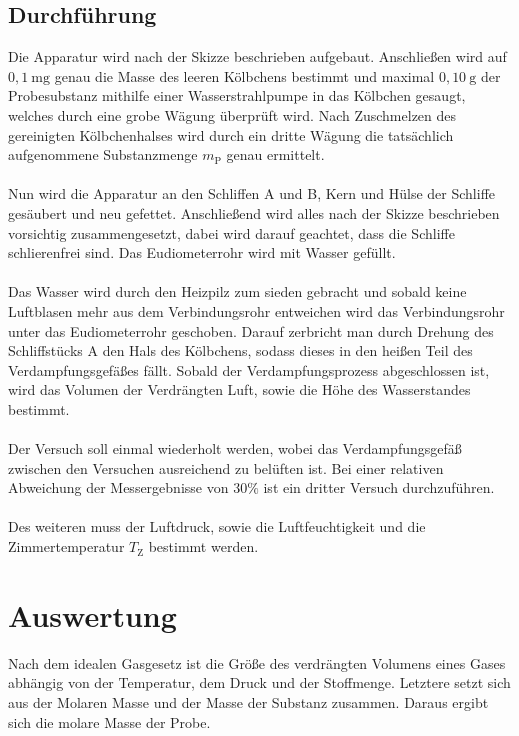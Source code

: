 \documentclass[12pt,a4paper,titlepage,headinclude,bibtotoc]{scrartcl}
\begin{document}
\subsection{Durchführung}
Die Apparatur wird nach der Skizze beschrieben aufgebaut. Anschließen wird auf $0,1 {~} \mathrm{mg}$ genau die Masse des leeren Kölbchens bestimmt und maximal $0,10{~}\mathrm{g}$ der Probesubstanz mithilfe einer Wasserstrahlpumpe in das Kölbchen gesaugt, welches durch eine grobe Wägung überprüft wird. Nach Zuschmelzen des gereinigten Kölbchenhalses wird durch ein dritte Wägung die tatsächlich aufgenommene Substanzmenge $m_{\mathrm{P}}$ genau ermittelt.\\\\
Nun wird die Apparatur an den Schliffen A und B, Kern und Hülse der Schliffe gesäubert und neu gefettet. Anschließend wird alles nach der Skizze beschrieben vorsichtig zusammengesetzt, dabei wird darauf geachtet, dass die Schliffe schlierenfrei sind. Das Eudiometerrohr wird mit Wasser gefüllt.\\\\
Das Wasser wird durch den Heizpilz zum sieden gebracht und sobald keine Luftblasen mehr aus dem Verbindungsrohr entweichen wird das Verbindungsrohr unter das Eudiometerrohr geschoben. Darauf zerbricht man durch Drehung des Schliffstücks A den Hals des Kölbchens, sodass dieses in den heißen Teil des Verdampfungsgefäßes fällt. Sobald der Verdampfungsprozess abgeschlossen ist, wird das Volumen der Verdrängten Luft, sowie die Höhe des Wasserstandes bestimmt.\\\\
Der Versuch soll einmal wiederholt werden, wobei das Verdampfungsgefäß zwischen den Versuchen ausreichend zu belüften ist. Bei einer relativen Abweichung der Messergebnisse von $30\%$ ist ein dritter Versuch durchzuführen.\\\\
Des weiteren muss der Luftdruck, sowie die Luftfeuchtigkeit und die Zimmertemperatur $T_{\mathrm{Z}}$ bestimmt werden.     


\section{Auswertung}

Nach dem idealen Gasgesetz ist die Größe des verdrängten Volumens eines Gases abhängig von der Temperatur, dem Druck und der Stoffmenge. Letztere setzt sich aus der Molaren Masse und der Masse der Substanz zusammen. Daraus ergibt sich die molare Masse der Probe.
\end{document}
